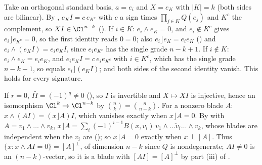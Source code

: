 Take an orthogonal standard basis, $a = e_i$ and $X = e_K$ with $|K| = k$ (both sides are bilinear). By , $e_K I = c\, e_{K^{c}}$ with $c$ a sign times $\prod_{j \in K} Q(e_j)$ and $K^{c}$ the complement, so $X I \in \Cl^{n-k}$ (). If $i \in K$: $e_i \wedge e_K = 0$, and $e_i \notin K^{c}$ gives $e_i \rfloor e_{K^{c}} = 0$, so the first identity reads $0 = 0$; also $e_i \rfloor e_K = e_i e_K$ () and $e_i \wedge (e_K I) = e_i e_K I$, since $e_i e_{K^c}$ has the single grade $n - k + 1$. If $i \notin K$: $e_i \wedge e_K = e_i e_K$, and $e_i e_K I = c\, e_i e_{K^{c}}$ with $i \in K^{c}$, which has the single grade $n - k - 1$, so equals $e_i \rfloor (e_K I)$; and both sides of the second identity vanish. This holds for every signature.

If $r = 0$, $I \tilde{I} = (-1)^{q} \ne 0$ (), so $I$ is invertible and $X \mapsto XI$ is injective, hence an isomorphism $\Cl^{k} \to \Cl^{n-k}$ by $\binom{n}{k} = \binom{n}{n-k}$. For a nonzero blade $A$: $x \wedge (A I) = (x \rfloor A) I$, which vanishes exactly when $x \rfloor A = 0$. By  with $A = v_1 \wedge \dots \wedge v_k$, $x \rfloor A = \sum_i (-1)^{i-1} B(x, v_i)\, v_1 \wedge \dots \check{v}_i \dots \wedge v_k$, whose blades are independent when the $v_i$ are (); so $x \rfloor A = 0$ exactly when $x \perp [A]$. Thus $\{x : x \wedge AI = 0\} = [A]^{\perp}$, of dimension $n - k$ since $Q$ is nondegenerate; $AI \ne 0$ is an $(n-k)$-vector, so it is a blade with $[AI] = [A]^{\perp}$ by part (iii) of .
